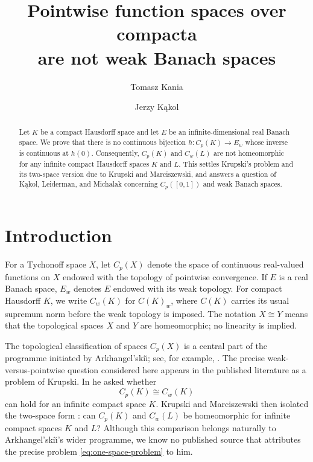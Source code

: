 \documentclass[a4paper]{amsart}
\title[Pointwise and weak topologies]{Pointwise function spaces over compacta\\
are not weak Banach spaces}
\author[T.~Kania]{Tomasz Kania}
\author[J.~K\k{a}kol]{Jerzy K\k{a}kol}
\begin{document}
\begin{abstract}
Let $K$ be a compact Hausdorff space and let $E$ be an
infinite-dimensional real Banach space.  We prove that there is no
continuous bijection $h\colon C_p(K)\to E_w$ whose inverse is continuous
at $h(0)$.  Consequently, $C_p(K)$ and $C_w(L)$ are not homeomorphic for
any infinite compact Hausdorff spaces $K$ and $L$.  This settles
Krupski's problem and its two-space version due to Krupski and
Marciszewski, and answers a question of K\k{a}kol, Leiderman, and Michalak
concerning $C_p([0,1])$ and weak Banach spaces.
\end{abstract}

\maketitle

\section{Introduction}

For a Tychonoff space $X$, let $C_p(X)$ denote the space of continuous
real-valued functions on $X$ endowed with the topology of pointwise
convergence.  If $E$ is a real Banach space, $E_w$ denotes $E$ endowed
with its weak topology.  For compact Hausdorff $K$, we write $C_w(K)$
for $C(K)_w$, where $C(K)$ carries its usual supremum norm before the
weak topology is imposed.  The notation $X\cong Y$ means that the
topological spaces $X$ and $Y$ are homeomorphic; no linearity is implied.

The topological classification of spaces $C_p(X)$ is a central part of
the programme initiated by Arkhangel'ski\u{\i}; see, for example,
\cite{Arkhangelskii1992}.  The precise weak-versus-pointwise question
considered here appears in the published literature as a problem of
Krupski.  In \cite[Problem~2]{Krupski2016} he asked whether
\begin{equation}\label{eq:one-space-problem}
                         C_p(K)\cong C_w(K)
\end{equation}
can hold for an infinite compact space $K$.  Krupski and Marciszewski
then isolated the two-space form \cite[Problem~1.2]{KrupskiMarciszewski2017}:
can $C_p(K)$ and $C_w(L)$ be homeomorphic for infinite compact spaces
$K$ and $L$?  Although this comparison belongs naturally to
Arkhangel'ski\u{\i}'s wider programme, we know no published source that
attributes the precise problem \eqref{eq:one-space-problem} to him.
\end{document}
